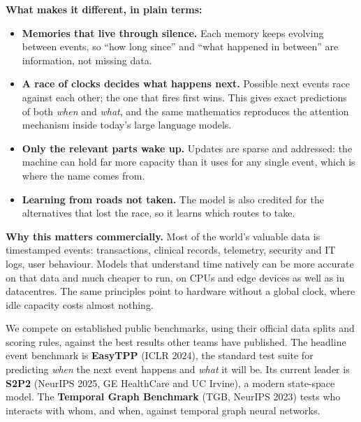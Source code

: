 \documentclass[10pt, a4 paper]{article}
\newcommand{\sect}[2]{\vspace{2pt}{\color{ours}\footnotesize\bfseries\MakeUppercase{#1}}\par\vspace{-3pt}{\LARGE\bfseries #2}\par\vspace{2pt}}
\begin{document}
\textbf{What makes it different, in plain terms:}
\begin{itemize}
\item \textbf{Memories that live through silence.} Each memory keeps evolving between events, so ``how long since'' and ``what happened in between'' are information, not missing data.
\item \textbf{A race of clocks decides what happens next.} Possible next events race against each other; the one that fires first wins. This gives exact predictions of both \emph{when} and \emph{what}, and the same mathematics reproduces the attention mechanism inside today's large language models.
\item \textbf{Only the relevant parts wake up.} Updates are sparse and addressed: the machine can hold far more capacity than it uses for any single event, which is where the name comes from.
\item \textbf{Learning from roads not taken.} The model is also credited for the alternatives that lost the race, so it learns which routes to take.
\end{itemize}

\begin{callout}
\textbf{Why this matters commercially.} Most of the world's valuable data is timestamped events: transactions, clinical records, telemetry, security and IT logs, user behaviour. Models that understand time natively can be more accurate on that data and much cheaper to run, on CPUs and edge devices as well as in datacentres. The same principles point to hardware without a global clock, where idle capacity costs almost nothing.
\end{callout}

\newpage
\sect{The proving ground}{The benchmarks, in plain language}

We compete on established public benchmarks, using their official data splits and scoring rules, against the best results other teams have published. The headline event benchmark is \textbf{EasyTPP} (ICLR 2024), the standard test suite for predicting \emph{when} the next event happens and \emph{what} it will be. Its current leader is \textbf{S2P2} (NeurIPS 2025, GE HealthCare and UC Irvine), a modern state-space model. The \textbf{Temporal Graph Benchmark} (TGB, NeurIPS 2023) tests who interacts with whom, and when, against temporal graph neural networks.
\end{document}
